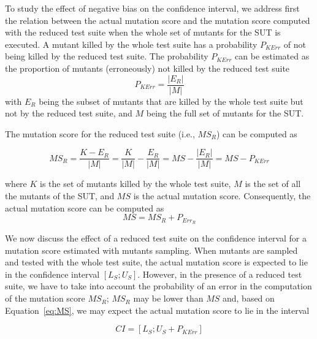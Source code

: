  {To study the effect of negative bias on the confidence interval, we address first the relation between the actual mutation score and the mutation score computed with the reduced test suite when the whole set of mutants for the SUT is executed. 
A mutant killed by the whole test suite has a probability $P_{\mathit{KErr}}$ of not being killed by the reduced test suite.
The probability $P_{\mathit{KErr}}$  can be estimated as the proportion of mutants (erroneously) not killed by the reduced test suite 
\begin{equation}
P_{\mathit{KErr}} = \frac{|E_R|}{|M|}
\end{equation}
with 
$E_R$ being the subset of mutants that are killed by the whole test suite but not by the reduced test suite, and $M$ being the full set of mutants for the SUT.}

The mutation score for the reduced test suite (i.e., $\mathit{MS}_R$) can be computed as

\begin{equation}
\mathit{MS}_R=\frac{K-E_R}{|M|}=\frac{K}{|M|}-\frac{E_R}{|M|}=\mathit{MS}-\frac{|E_R|}{|M|}=\mathit{MS}-P_{\mathit{KErr}}
\end{equation}

where $K$ is the set of mutants killed by the whole test suite, $M$ is the set of all the mutants of the SUT,  and $\mathit{MS}$ is the actual mutation score. Consequently, the actual mutation score can be computed as 
\begin{equation}
\label{eq:MS}
\mathit{MS}=\mathit{MS}_R+P_{\mathit{Err}_R}
\end{equation}

 {We now discuss the effect of a reduced test suite on the confidence interval for a mutation score estimated with mutants sampling. When mutants are sampled and tested with the whole test suite, the actual mutation score is expected to lie in the confidence interval $[\mathit{L}_{S};\mathit{U}_{S}]$. 
However, in the presence of a reduced test suite, we have to take into account the probability of an error in the computation of the mutation score $\mathit{MS}_R$;  $\mathit{MS}_R$ may be lower than $\mathit{MS}$ and, based on Equation~\ref{eq:MS}, we may expect the actual mutation score to lie in the interval}

\begin{equation}
\label{eq:CI}
\mathit{CI}=[\mathit{L}_{S};\mathit{U}_{S}+P_{\mathit{KErr}}]
\end{equation}

